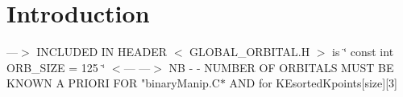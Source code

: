 \hypertarget{index_intro_sec}{}\section{Introduction}\label{index_intro_sec}
---$>$ I\-N\-C\-L\-U\-D\-E\-D I\-N H\-E\-A\-D\-E\-R $<$ G\-L\-O\-B\-A\-L\-\_\-\-O\-R\-B\-I\-T\-A\-L.\-H $>$ is \char`\"{} const int O\-R\-B\-\_\-\-S\-I\-Z\-E = 125 \char`\"{} $<$--- ---$>$ N\-B -\/ -\/ N\-U\-M\-B\-E\-R O\-F O\-R\-B\-I\-T\-A\-L\-S M\-U\-S\-T B\-E K\-N\-O\-W\-N A P\-R\-I\-O\-R\-I F\-O\-R "binary\-Manip.\-C$\ast$ A\-N\-D for K\-Esorted\-Kpoints\mbox{[}size\mbox{]}\mbox{[}3\mbox{]} 